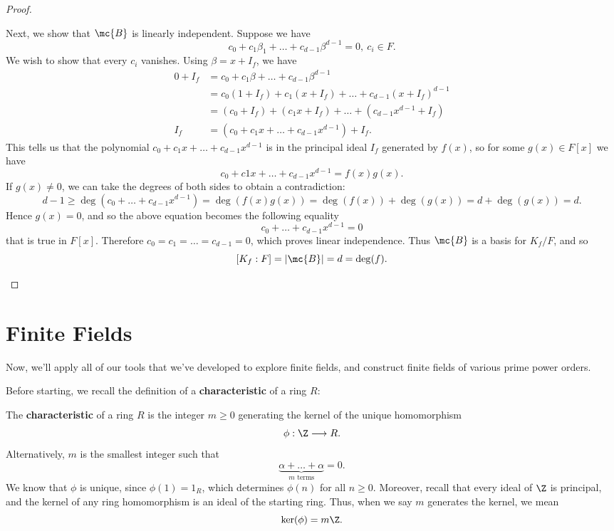 \documentclass[math1530-lecture-notes]{subfiles}
\begin{document}
\begin{proof}[Proof]
\begin{enumerate}
      Next, we show that $\mc{B}$ is linearly independent. Suppose we have \[
        c_0+c_1\beta_1+\ldots+c_{d-1}\beta^{d-1}=0,\ c_i\in F
      .\] We wish to show that every $c_i$ vanishes. Using $\beta=x+I_f$, we have
      \begin{align*}
        0+I_f&= c_0+c_1\beta+\ldots+c_{d-1}\beta^{d-1} \\
             &= c_0(1+I_f)+c_1(x+I_f)+\ldots+c_{d-1}(x+I_f)^{d-1}\\
             &= (c_0+I_f)+(c_1x+I_f)+\ldots+(c_{d-1}x^{d-1}+I_f)\\
          I_f&= (c_0+c_1x+\ldots+c_{d-1}x^{d-1})+I_f
      .\end{align*}
      This tells us that the polynomial $c_0+c_1x+\ldots+c_{d-1}x^{d-1}$ is in the principal ideal
      $I_f$ generated by $f(x)$, so for some $g(x)\in F[x]$ we have \[
        c_0+c1x+\ldots+c_{d-1}x^{d-1}=f(x)g(x)
      .\] If $g(x)\neq 0$, we can take the degrees of both sides to obtain a contradiction: \[
      d-1 \ge \deg(c_0+\ldots+c_{d-1}x^{d-1})=\deg(f(x)g(x))=\deg(f(x))+\deg(g(x))=d+\deg(g(x))=d
    .\] Hence $g(x)=0$, and so the above equation becomes the following equality \[
      c_0+\ldots+c_{d-1}x^{d-1}=0
    \] that is true in $F[x]$. Therefore $c_0=c_1=\ldots=c_{d-1}=0$, which proves linear
    independence. Thus $\mc{B}$ is a basis for $K_f / F$, and so \[
      \left[K_f : F\right]=\left| \mc{B} \right| =d=\deg(f)
    .\] 
  \end{enumerate}
\end{proof}


\section{Finite Fields}

Now, we'll apply all of our tools that we've developed to explore finite fields, and construct
finite fields of various prime power orders. 

Before starting, we recall the definition of a \textbf{characteristic} of a ring $R$:
\begin{definition}[Characteristic]{}
  The \textbf{characteristic} of a ring $R$ is the integer $m\ge 0$ generating the kernel of the
  unique homomorphism \[
    \phi:\Z\longrightarrow R
  .\] Alternatively, $m$ is the smallest integer such that \[
    \underbrace{\alpha+\ldots+\alpha}_\text{$m$ terms}=0
  .\] We know that $\phi$ is unique, since $\phi(1)=1_R$, which determines $\phi(n)$ for all $n\ge
  0$. Moreover, recall that every ideal of $\Z$ is principal, and the kernel of any ring
  homomorphism is an ideal of the starting ring. Thus, when we say $m$ generates the kernel, we mean
  \[
    \ker(\phi)=m\Z
  .\] 
\end{definition}
\end{document}
